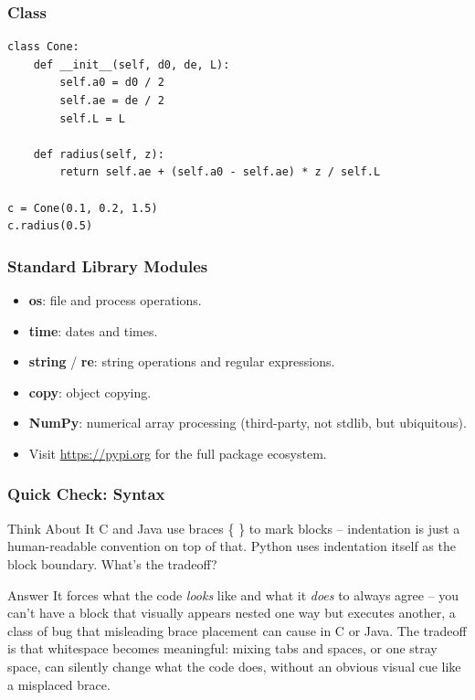 \begin{frame}[fragile]\frametitle{Class}
\begin{lstlisting}
class Cone:
    def __init__(self, d0, de, L):
        self.a0 = d0 / 2
        self.ae = de / 2
        self.L = L

    def radius(self, z):
        return self.ae + (self.a0 - self.ae) * z / self.L

c = Cone(0.1, 0.2, 1.5)
c.radius(0.5)
\end{lstlisting}
\end{frame}

\begin{frame}[fragile]\frametitle{Standard Library Modules}
	\begin{itemize}
	\item \textbf{os}: file and process operations.
	\item \textbf{time}: dates and times.
	\item \textbf{string} / \textbf{re}: string operations and regular expressions.
	\item \textbf{copy}: object copying.
	\item \textbf{NumPy}: numerical array processing (third-party, not stdlib, but ubiquitous).
	\item Visit \url{https://pypi.org} for the full package ecosystem.
	\end{itemize}
\end{frame}

\begin{frame}[fragile]\frametitle{Quick Check: Syntax}
\begin{block}{Think About It}
C and Java use braces \{ \} to mark blocks -- indentation is just a human-readable convention on top of that. Python uses indentation itself as the block boundary. What's the tradeoff?
\end{block}
\pause
\begin{block}{Answer}
It forces what the code \emph{looks} like and what it \emph{does} to always agree -- you can't have a block that visually appears nested one way but executes another, a class of bug that misleading brace placement can cause in C or Java. The tradeoff is that whitespace becomes meaningful: mixing tabs and spaces, or one stray space, can silently change what the code does, without an obvious visual cue like a misplaced brace.
\end{block}
\end{frame}

